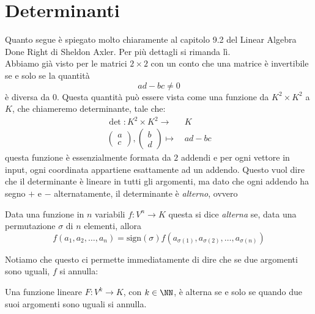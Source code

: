 \documentclass[11pt]{scrartcl}
\begin{document}
   	 \newpage
   	 
   	 \section{Determinanti}
   	 Quanto segue è spiegato molto chiaramente al capitolo 9.2 del Linear Algebra Done Right di Sheldon Axler. Per più dettagli si rimanda lì. \\
   	 Abbiamo già visto per le matrici $2\times 2$ con un conto che una matrice è invertibile se e solo se la quantità
   	 $$ad-bc\ne 0$$
   	 è diversa da $0$. Questa quantità può essere vista come una funzione da $K^2\times K^2$ a $K$, che chiameremo determinante, tale che:
   	 \begin{align*}
   	 	\det:K^2\times K^2 \longrightarrow & \,K \\
   	 	\begin{pmatrix}
   	 		a \\
   	 		c
   	 	\end{pmatrix},
   	 	\begin{pmatrix}
   	 		b \\
   	 		d
   	 	\end{pmatrix} \longmapsto & \,ad-bc
   	 \end{align*} 
   	 questa funzione è essenzialmente formata da $2$ addendi e per ogni vettore in input, ogni coordinata appartiene esattamente ad un addendo. Questo vuol dire che il determinante è lineare in tutti gli argomenti, ma dato che ogni addendo ha segno $+$ e $-$ alternatamente, il determinante è \textit{alterno}, ovvero
   	 \begin{definition}
   	 	Data una funzione in $n$ variabili $f:V^n\to K$ questa si dice \textit{alterna} se, data una permutazione $\sigma$ di $n$ elementi, allora 
   	 	$$f(a_1,a_2,\dots,a_n)=\text{sign}(\sigma)f\left(a_{\sigma(1)},a_{\sigma(2)},\dots,a_{\sigma(n)}\right)$$
   	 \end{definition}
   	 Notiamo che questo ci permette immediatamente di dire che se due argomenti sono uguali, $f$ si annulla:
   	 \begin{lemma}
   	 	Una funzione lineare $F:V^k\to K$, con $k\in\NN$, è alterna se e solo se quando due suoi argomenti sono uguali si annulla.
   	 \end{lemma} 
\end{document}
